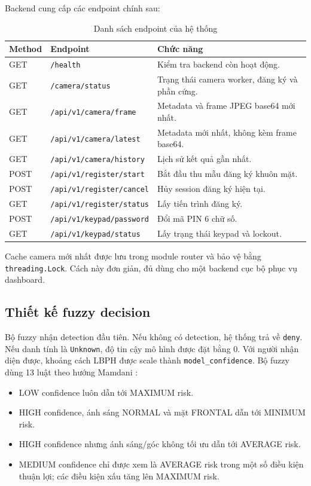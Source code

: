 Backend cung cấp các endpoint chính sau:

\begin{table}[H]
\centering
\caption{Danh sách endpoint của hệ thống}
\label{tab:api_endpoints}
\begin{tabularx}{\textwidth}{|l|l|X|}
\hline
\textbf{Method} & \textbf{Endpoint} & \textbf{Chức năng} \\
\hline
GET & \texttt{/health} & Kiểm tra backend còn hoạt động. \\
\hline
GET & \texttt{/camera/status} & Trạng thái camera worker, đăng ký và phần cứng. \\
\hline
GET & \texttt{/api/v1/camera/frame} & Metadata và frame JPEG base64 mới nhất. \\
\hline
GET & \texttt{/api/v1/camera/latest} & Metadata mới nhất, không kèm frame base64. \\
\hline
GET & \texttt{/api/v1/camera/history} & Lịch sử kết quả gần nhất. \\
\hline
POST & \texttt{/api/v1/register/start} & Bắt đầu thu mẫu đăng ký khuôn mặt. \\
\hline
POST & \texttt{/api/v1/register/cancel} & Hủy session đăng ký hiện tại. \\
\hline
GET & \texttt{/api/v1/register/status} & Lấy tiến trình đăng ký. \\
\hline
POST & \texttt{/api/v1/keypad/password} & Đổi mã PIN 6 chữ số. \\
\hline
GET & \texttt{/api/v1/keypad/status} & Lấy trạng thái keypad và lockout. \\
\hline
\end{tabularx}
\end{table}

Cache camera mới nhất được lưu trong module router và bảo vệ bằng \texttt{threading.Lock}. Cách này đơn giản, đủ dùng cho một backend cục bộ phục vụ dashboard.

\subsection{Thiết kế fuzzy decision}

Bộ fuzzy nhận detection đầu tiên. Nếu không có detection, hệ thống trả về \texttt{deny}. Nếu danh tính là \texttt{Unknown}, độ tin cậy mô hình được đặt bằng 0. Với người nhận diện được, khoảng cách LBPH được scale thành \texttt{model\_confidence}. Bộ fuzzy dùng 13 luật theo hướng Mamdani \cite{mamdani1975}:

\begin{itemize}
    \item LOW confidence luôn dẫn tới MAXIMUM risk.
    \item HIGH confidence, ánh sáng NORMAL và mặt FRONTAL dẫn tới MINIMUM risk.
    \item HIGH confidence nhưng ánh sáng/góc không tối ưu dẫn tới AVERAGE risk.
    \item MEDIUM confidence chỉ được xem là AVERAGE risk trong một số điều kiện thuận lợi; các điều kiện xấu tăng lên MAXIMUM risk.
\end{itemize}

